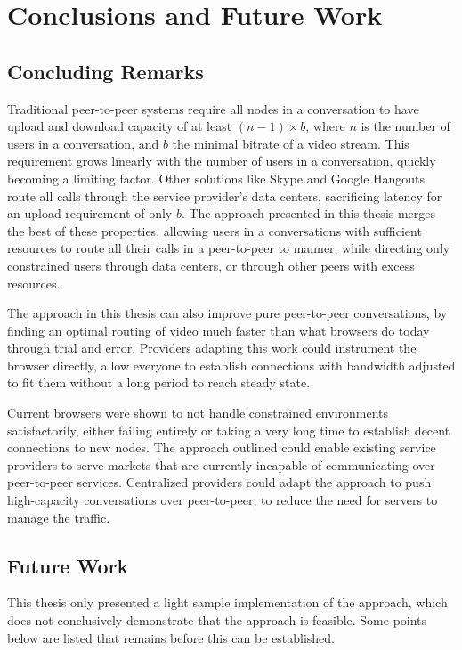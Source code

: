 \chapter{Conclusions and Future Work}\label{chp:conclusions}


\section{Concluding Remarks}\label{sec:conclusions}

Traditional peer-to-peer systems require all nodes in a conversation to have upload and download capacity of at least $(n-1) \times b$, where $n$ is the number of users in a conversation, and $b$ the minimal bitrate of a video stream. This requirement grows linearly with the number of users in a conversation, quickly becoming a limiting factor. Other solutions like Skype and Google Hangouts route all calls through the service provider's data centers, sacrificing latency for an upload requirement of only $b$. The approach presented in this thesis merges the best of these properties, allowing users in a conversations with sufficient resources to route all their calls in a peer-to-peer to manner, while directing only constrained users through data centers, or through other peers with excess resources.

The approach in this thesis can also improve pure peer-to-peer conversations, by finding an optimal routing of video much faster than what browsers do today through trial and error. Providers adapting this work could instrument the browser directly, allow everyone to establish connections with bandwidth adjusted to fit them without a long period to reach steady state.

Current browsers were shown to not handle constrained environments satisfactorily, either failing entirely or taking a very long time to establish decent connections to new nodes. The approach outlined could enable existing service providers to serve markets that are currently incapable of communicating over peer-to-peer services. Centralized providers could adapt the approach to push high-capacity conversations over peer-to-peer, to reduce the need for servers to manage the traffic.


\section{Future Work}\label{sec:future_work}

This thesis only presented a light sample implementation of the approach, which does not conclusively demonstrate that the approach is feasible. Some points below are listed that remains before this can be established.

